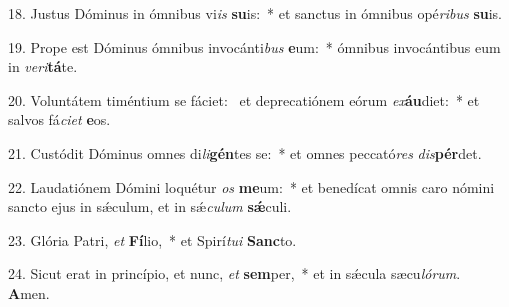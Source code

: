 18. Justus Dóminus in ómnibus vi\textit{is} \textbf{su}is:~*  et sanctus in ómnibus opé\textit{ri}\textit{bus} \textbf{su}is.\

19. Prope est Dóminus ómnibus invocánti\textit{bus} \textbf{e}um:~*  ómnibus invocántibus eum in \textit{ve}\textit{ri}\textbf{tá}te.\

20. Voluntátem timéntium se fáciet: \dag\  et deprecatiónem eórum \textit{ex}\textbf{áu}diet:~*  et salvos fá\textit{ci}\textit{et} \textbf{e}os.\

21. Custódit Dóminus omnes di\textit{li}\textbf{gén}tes se:~*  et omnes peccató\textit{res} \textit{dis}\textbf{pér}det.\

22. Laudatiónem Dómini loquétur \textit{os} \textbf{me}um:~*  et benedícat omnis caro nómini sancto ejus in sǽculum, et in sǽ\textit{cu}\textit{lum} \textbf{sǽ}culi.\

23. Glória Patri, \textit{et} \textbf{Fí}lio,~*  et Spirí\textit{tu}\textit{i} \textbf{Sanc}to.\

24. Sicut erat in princípio, et nunc, \textit{et} \textbf{sem}per,~*  et in sǽcula sæcu\textit{ló}\textit{rum}. \textbf{A}men.\

